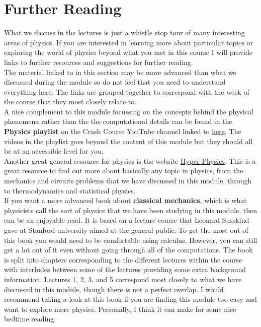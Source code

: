 
\chapter{Further Reading}
What we discuss in the lectures is just a whistle stop tour of many interesting areas of physics. If you are interested in learning more about particular topics or exploring the world of physics beyond what you met in this course I will provide links to further resources and suggestions for further reading.\\

The material linked to in this section may be more advanced than what we discussed during the module so do not feel that you need to understand everything here. The links are grouped together to correspond with the week of the course that they most closely relate to.\\

A nice complement to this module focussing on the concepts behind the physical phenomena rather than the the computational details can be found in the \textbf{Physics playlist} on the Crash Course YouTube channel linked to \href{https://www.youtube.com/playlist?list=PL8dPuuaLjXtN0ge7yDk_UA0ldZJdhwkoV}{here}. The videos in the playlist goes beyond the content of this module but they should all be at an accessible level for you.\\

Another great general resource for physics is the website \href{http://hyperphysics.phy-astr.gsu.edu/hbase/index.html}{Hyper Physics}.  This is a great resource to find  out more about basically any topic in physics, from the mechanics and circuits problems that we have discussed in this module, through to thermodynamics and statistical physics.\\

If you want a more advanced book about \textbf{classical mechanics}, which is what physicists call the sort of physics that we have been studying in this module, then \citep{susskind_classical} can be an enjoyable read. It is based on a lecture course that Leonard Susskind gave at Stanford university aimed at the general public. To get the most out of this book you would need to be comfortable using calculus. However, you can still get a lot out of it even without going through all of the computations.  The book is split into chapters corresponding to the different lectures within the course with interludes between some of the lectures providing some extra background information. Lectures 1, 2, 3, and 5 correspond most closely to what we have discussed in this module, though there is not a perfect overlap. I would recommend taking a look at this book if you are finding this module too easy and want to explore more physics. Personally, I think it can make for some nice bedtime reading.\\

